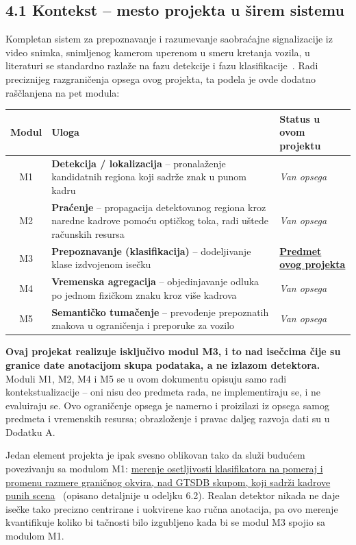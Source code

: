 \documentclass[11pt,a4paper]{article}
\newcommand{\mvp}[1]{{\setulcolor{ForestGreen}\ul{#1}}}
\newcommand{\str}[1]{{\setulcolor{BurntOrange}\ul{#1}}}
\begin{document}
\subsection*{4.1 Kontekst -- mesto projekta u širem sistemu}

Kompletan sistem za prepoznavanje i razumevanje saobraćajne signalizacije iz video snimka, snimljenog kamerom uperenom u smeru kretanja vozila, u literaturi se standardno razlaže na fazu detekcije i fazu klasifikacije~\cite{tsr-survey, gtsdb}. Radi preciznijeg razgraničenja opsega ovog projekta, ta podela je ovde dodatno raščlanjena na pet modula:

\begin{center}
\begin{tabular}{|c|p{7.6cm}|p{4.6cm}|}
\hline
\textbf{Modul} & \textbf{Uloga} & \textbf{Status u ovom projektu} \\
\hline
M1 & \textbf{Detekcija / lokalizacija} -- pronalaženje kandidatnih regiona koji sadrže znak u punom kadru & \textit{Van opsega} \\
\hline
M2 & \textbf{Praćenje} -- propagacija detektovanog regiona kroz naredne kadrove pomoću optičkog toka, radi uštede računskih resursa & \textit{Van opsega} \\
\hline
M3 & \textbf{Prepoznavanje (klasifikacija)} -- dodeljivanje klase izdvojenom isečku & \textbf{\mvp{Predmet ovog projekta}} \\
\hline
M4 & \textbf{Vremenska agregacija} -- objedinjavanje odluka po jednom fizičkom znaku kroz više kadrova & \textit{Van opsega} \\
\hline
M5 & \textbf{Semantičko tumačenje} -- prevođenje prepoznatih znakova u ograničenja i preporuke za vozilo & \textit{Van opsega} \\
\hline
\end{tabular}
\end{center}

\textbf{Ovaj projekat realizuje isključivo modul M3, i to nad isečcima čije su granice date anotacijom skupa podataka, a ne izlazom detektora.} Moduli M1, M2, M4 i M5 se u ovom dokumentu opisuju samo radi kontekstualizacije -- oni nisu deo predmeta rada, ne implementiraju se, i ne evaluiraju se. Ovo ograničenje opsega je namerno i proizilazi iz opsega samog predmeta i vremenskih resursa; obrazloženje i pravac daljeg razvoja dati su u Dodatku A.

Jedan element projekta je ipak svesno oblikovan tako da služi budućem povezivanju sa modulom M1: \str{merenje osetljivosti klasifikatora na pomeraj i promenu razmere graničnog okvira, nad GTSDB skupom, koji sadrži kadrove punih scena}~\cite{gtsdb} (opisano detaljnije u odeljku 6.2). Realan detektor nikada ne daje isečke tako precizno centrirane i uokvirene kao ručna anotacija, pa ovo merenje kvantifikuje koliko bi tačnosti bilo izgubljeno kada bi se modul M3 spojio sa modulom M1.
\end{document}
